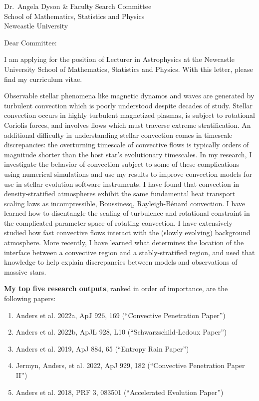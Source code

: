 \documentclass[12pt, a4paper]{letter}
\begin{document}
\begin{letter}{
        Dr.~Angela Dyson \& Faculty Search Committee \\
        School of Mathematics, Statistics and Physics \\
        Newcastle University}
\opening{Dear Committee:}

    I am applying for the position of Lecturer in Astrophysics at the Newcastle University School of Mathematics, Statistics and Physics.
    With this letter, please find my curriculum vitae.

    Observable stellar phenomena like magnetic dynamos and waves are generated by turbulent convection which is poorly understood despite decades of study.
    Stellar convection occurs in highly turbulent magnetized plasmas, is subject to rotational Coriolis forces, and involves flows which must traverse extreme stratification.
    An additional difficulty in understanding stellar convection comes in timescale discrepancies: the overturning timescale of convective flows is typically orders of magnitude shorter than the host star's evolutionary timescales.
    In my research, I investigate the behavior of convection subject to some of these complications using numerical simulations and use my results to improve convection models for use in stellar evolution software instruments.
    I have found that convection in density-stratified atmospheres exhibit the same fundamental heat transport scaling laws as incompressible, Boussinesq, Rayleigh-B\'{e}nard convection.
    I have learned how to disentangle the scaling of turbulence and rotational constraint in the complicated parameter space of rotating convection.
    I have extensively studied how fast convective flows interact with the (slowly evolving) background atmosphere.
    More recently, I have learned what determines the location of the interface between a convective region and a stably-stratified region, and used that knowledge to help explain discrepancies between models and observations of massive stars.

    \textbf{My top five research outputs}, ranked in order of importance, are the following papers:
    \begin{enumerate}
        \item Anders et al. 2022a, ApJ 926, 169 (“Convective Penetration Paper”)
        \item Anders et al. 2022b, ApJL 928, L10 (“Schwarzschild-Ledoux Paper”)
        \item Anders et al. 2019, ApJ 884, 65 (“Entropy Rain Paper”)
        \item Jermyn, Anders, et al. 2022, ApJ 929, 182 (“Convective Penetration Paper II”)
        \item Anders et al. 2018, PRF 3, 083501 (“Accelerated Evolution Paper”)
    \end{enumerate}


\end{letter}
\end{document}
